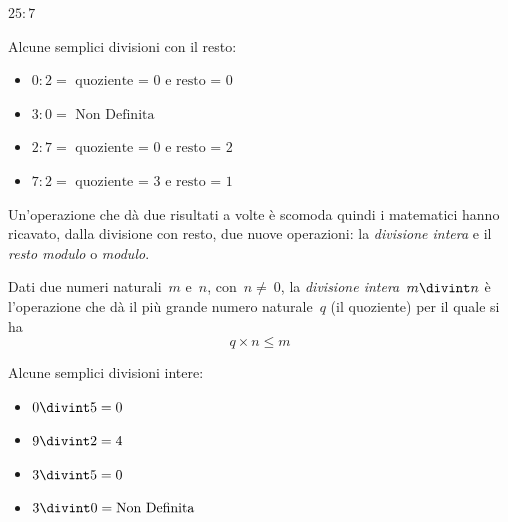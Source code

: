 \begin{esempio}{}{} \(25:7\)

\end{esempio}

 \begin{esempio}{}{}
 Alcune semplici divisioni con il resto:
 \vspace{-1em}
\begin{multicols}{2}
\begin{itemize} [nosep]
\item \(0 : 2 = \text{ quoziente~=~0 e resto~=~0}\)
\item \(3 : 0 = \text{ Non Definita}\)
\item \(2 : 7 = \text{ quoziente~=~0 e resto~=~2}\)
\item \(7 : 2 = \text{ quoziente~=~3 e resto~=~1}\)
\end{itemize}
\end{multicols}
\end{esempio}

Un'operazione che dà due risultati a volte è scomoda quindi i matematici 
hanno ricavato, dalla divisione con resto, due nuove operazioni: 
la \emph{divisione intera} e il \emph{resto modulo} o \emph{modulo}.

\begin{definizione}{}{}
Dati due numeri naturali~\(m\) e~\(n\), con~\(n\neq~0\), la 
\emph{divisione intera}~\(m\divint n\) è l'operazione che dà il più grande 
numero naturale~\(q\) (il quoziente) per il quale si ha
\[q\times n\le m\]
\end{definizione}

\begin{esempio}{}{}
Alcune semplici divisioni intere:
\vspace{-1em}
\begin{multicols}{2}
\begin{itemize} [nosep]
\item \(0 \divint 5=0\)
\item \(9 \divint 2=4\)
\item \(3 \divint 5=0\)
\item \(3 \divint 0=\text{Non Definita}\)
\end{itemize}
\end{multicols}
\end{esempio}


